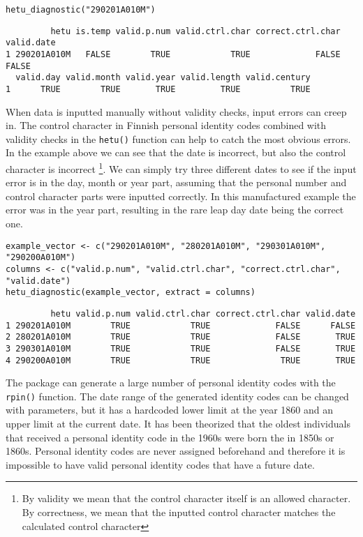 \begin{verbatim}
hetu_diagnostic("290201A010M")
\end{verbatim}

\begin{verbatim}
         hetu is.temp valid.p.num valid.ctrl.char correct.ctrl.char valid.date
1 290201A010M   FALSE        TRUE            TRUE             FALSE      FALSE
  valid.day valid.month valid.year valid.length valid.century
1      TRUE        TRUE       TRUE         TRUE          TRUE
\end{verbatim}

When data is inputted manually without validity checks, input errors can creep in. The control character in Finnish personal identity codes combined with validity checks in the \texttt{hetu()} function can help to catch the most obvious errors. In the example above we can see that the date is incorrect, but also the control character is incorrect \footnote{By validity we mean that the control character itself is an allowed character. By correctness, we mean that the inputted control character matches the calculated control character}. We can simply try three different dates to see if the input error is in the day, month or year part, assuming that the personal number and control character parts were inputted correctly. In this manufactured example the error was in the year part, resulting in the rare leap day date being the correct one.

\begin{verbatim}
example_vector <- c("290201A010M", "280201A010M", "290301A010M", "290200A010M")
columns <- c("valid.p.num", "valid.ctrl.char", "correct.ctrl.char", "valid.date")
hetu_diagnostic(example_vector, extract = columns)
\end{verbatim}

\begin{verbatim}
         hetu valid.p.num valid.ctrl.char correct.ctrl.char valid.date
1 290201A010M        TRUE            TRUE             FALSE      FALSE
2 280201A010M        TRUE            TRUE             FALSE       TRUE
3 290301A010M        TRUE            TRUE             FALSE       TRUE
4 290200A010M        TRUE            TRUE              TRUE       TRUE
\end{verbatim}

The  package can generate a large number of personal identity codes with the \texttt{rpin()} function. The date range of the generated identity codes can be changed with parameters, but it has a hardcoded lower limit at the year 1860 and an upper limit at the current date. It has been theorized that the oldest individuals that received a personal identity code in the 1960s were born the in 1850s or 1860s. Personal identity codes are never assigned beforehand and therefore it is impossible to have valid personal identity codes that have a future date. \citep{salste2021}

